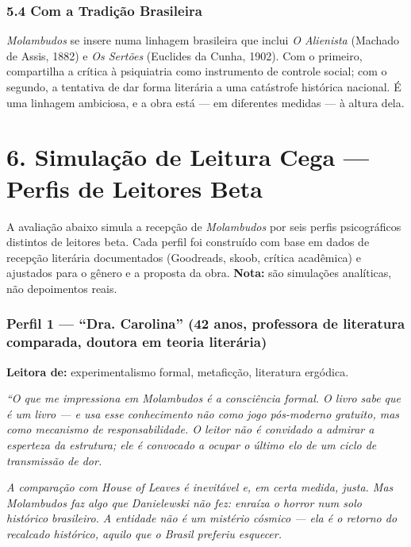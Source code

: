 \documentclass[14pt,openany]{extbook}
\begin{document}
\subsection*{5.4 Com a Tradição Brasileira}

\textit{Molambudos} se insere numa linhagem brasileira que inclui \textit{O Alienista} (Machado de Assis, 1882) e \textit{Os Sertões} (Euclides da Cunha, 1902). Com o primeiro, compartilha a crítica à psiquiatria como instrumento de controle social; com o segundo, a tentativa de dar forma literária a uma catástrofe histórica nacional. É uma linhagem ambiciosa, e a obra está --- em diferentes medidas --- à altura dela.

\chapter*{6. Simulação de Leitura Cega --- Perfis de Leitores Beta}

\noindent A avaliação abaixo simula a recepção de \textit{Molambudos} por seis perfis psicográficos distintos de leitores beta. Cada perfil foi construído com base em dados de recepção literária documentados (Goodreads, skoob, crítica acadêmica) e ajustados para o gênero e a proposta da obra. \textbf{Nota:} são simulações analíticas, não depoimentos reais.

\vspace{0.8em}

\subsection*{Perfil 1 --- ``Dra. Carolina'' (42 anos, professora de literatura comparada, doutora em teoria literária)}

\textbf{Leitora de:} experimentalismo formal, metaficção, literatura ergódica.

\vspace{0.3em}
\noindent\textit{``O que me impressiona em Molambudos é a consciência formal. O livro sabe que é um livro --- e usa esse conhecimento não como jogo pós-moderno gratuito, mas como mecanismo de responsabilidade. O leitor não é convidado a admirar a esperteza da estrutura; ele é convocado a ocupar o último elo de um ciclo de transmissão de dor.}

\vspace{0.3em}
\noindent\textit{A comparação com House of Leaves é inevitável e, em certa medida, justa. Mas Molambudos faz algo que Danielewski não fez: enraíza o horror num solo histórico brasileiro. A entidade não é um mistério cósmico --- ela é o retorno do recalcado histórico, aquilo que o Brasil preferiu esquecer.}
\end{document}
